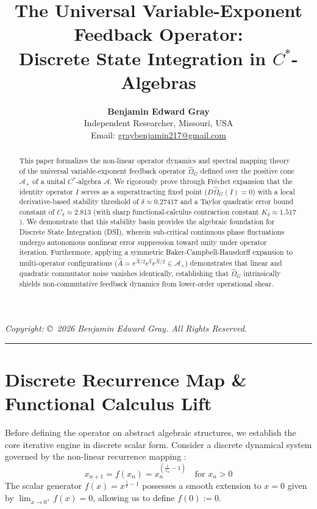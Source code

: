 \documentclass[11pt,a4paper]{article}
\title{\textbf{The Universal Variable-Exponent Feedback Operator:\\Discrete State Integration in $C^*$-Algebras}}
\author{\textbf{Benjamin Edward Gray}\\
Independent Researcher, Missouri, USA\\
Email: \href{mailto:graybenjamin217@gmail.com}{graybenjamin217@gmail.com}}
\date{}
\begin{document}
\maketitle
\thispagestyle{fancy}

\begin{abstract}
\noindent This paper formalizes the non-linear operator dynamics and spectral mapping theory of the universal variable-exponent feedback operator $\hat{\Omega}_G$ defined over the positive cone $\mathcal{A}_+$ of a unital $C^*$-algebra $\mathcal{A}$. We rigorously prove through Fr\'echet expansion that the identity operator $I$ serves as a superattracting fixed point ($D\hat{\Omega}_G(I)=0$) with a local derivative-based stability threshold of $\delta \approx 0.27417$ and a Taylor quadratic error bound constant of $C_\delta \approx 2.813$ (with sharp functional-calculus contraction constant $K_\delta \approx 1.517$). We demonstrate that this stability basin provides the algebraic foundation for Discrete State Integration (DSI), wherein sub-critical continuous phase fluctuations undergo autonomous nonlinear error suppression toward unity under operator iteration. Furthermore, applying a symmetric Baker-Campbell-Hausdorff expansion to multi-operator configurations ($\hat{A} = e^{\hat{X}/2}e^{\hat{Y}}e^{\hat{X}/2} \in \mathcal{A}_+$) demonstrates that linear and quadratic commutator noise vanishes identically, establishing that $\hat{\Omega}_G$ intrinsically shields non-commutative feedback dynamics from lower-order operational shear.
\end{abstract}

\vspace{1em}
\noindent \textit{Copyright: \copyright\ 2026 Benjamin Edward Gray. All Rights Reserved.}
\vspace{1em}

\tableofcontents
\vspace{1em}
\hrule
\vspace{1.5em}

\section{Discrete Recurrence Map \& Functional Calculus Lift}

Before defining the operator on abstract algebraic structures, we establish the core iterative engine in discrete scalar form. Consider a discrete dynamical system governed by the non-linear recurrence mapping \cite{GrayAnanke}:
\begin{equation}
x_{n+1} = f(x_n) = x_n^{\left(\frac{1}{x_n} - 1\right)} \quad \text{for } x_n > 0
\end{equation}
The scalar generator $f(x) = x^{\frac{1}{x}-1}$ possesses a smooth extension to $x = 0$ given by $\lim_{x \to 0^+} f(x) = 0$, allowing us to define $f(0) := 0$.
\end{document}
